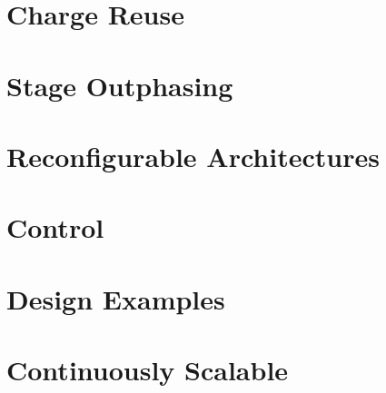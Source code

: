 \documentclass{report}
\begin{document}
	\chapter{Charge Reuse}
	\chapter{Stage Outphasing}
	\chapter{Reconfigurable Architectures}
	
	
	
	\chapter{Control}
	\chapter{Design Examples}
	\chapter{Continuously Scalable}
	
\end{document}
